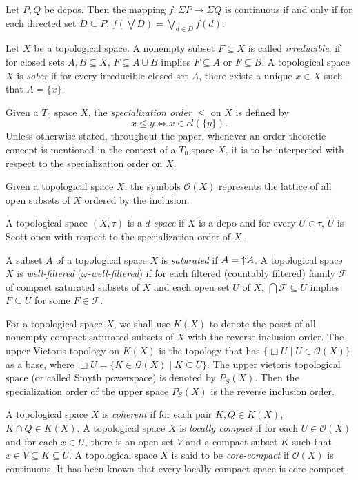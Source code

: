 \documentclass[preprint,12pt]{elsarticle}
\numberwithin{equation}{section}
\newcommand{\up}{\mathord{\uparrow}\hspace{0.05em}}
\begin{document}
\quad Let $P,Q$ be dcpos. Then the mapping $f:\Sigma P\longrightarrow \Sigma Q$ is continuous if and only if for each directed set $D\subseteq P$, $f(\bigvee D)=\bigvee\limits_{d\in D}f(d)$.

\quad Let $X$ be a topological space. A nonempty subset $F\subseteq X$ is called {\em irreducible}, if for closed sets $A, B\subseteq X$, $F\subseteq A\cup B$ implies $F\subseteq A$ or $F\subseteq B$. A topological space $X$ is {\em sober} if for every irreducible closed set $A$, there exists a unique $x\in X$ such that $A=\overline{\{x\}}$.

\quad Given a $T_{0}$ space $X$, the {\em specialization order} $\leq$ on $X$ is defined by
$$x\leq y \Longleftrightarrow x\in cl(\{y\}).$$
Unless otherwise stated, throughout
the paper, whenever an order-theoretic concept is mentioned in the context of a $T_{0}$ space $X$, it is to be interpreted with respect to the specialization order on $X$.

\quad Given a topological space $X$, the symbols $\mathcal{O}(X)$ represents the lattice of all open subsets of $X$ ordered by the inclusion.

\quad A topological space $(X,\tau)$ is a {\em $d$-space} if $X$ is a dcpo and for every $U\in\tau$, $U$ is Scott open with respect to the specialization order of $X$.

\quad A subset $A$ of a topological space $X$ is {\em saturated} if $A=\up A$. A topological space $X$ is {\em well-filtered} ({\em $\omega$-well-filtered}) if for each filtered (countably filtered) family $\mathcal{F}$ of compact saturated subsets of $X$ and each open set $U$ of $X$, $\bigcap \mathcal{F}\subseteq U$ implies $F\subseteq U$ for some $F\in\mathcal{F}$.

 \quad For a topological space $X$, we shall use $K(X)$ to denote the poset of all nonempty
compact saturated subsets of $X$ with the reverse inclusion order. The upper Vietoris topology on $K(X)$ is the topology that has $\{\Box U\mid U\in\mathcal{O}(X)\}$ as a base, where $\Box U=\{K\in\mathcal{Q}(X)\mid K\subseteq U\}$. The upper vietoris topological space (or called Smyth powerspace) is denoted by $P_{S}(X)$. Then the specialization order of the upper space $P_{S}(X)$ is the reverse inclusion order.

\quad A topological space $X$ is {\em coherent} if for each pair $K,Q\in K(X)$, $K\cap Q\in K(X)$. A topological space $X$ is {\em locally compact} if for each $U\in \mathcal{O}(X)$ and for each $x\in U$, there is an open set $V$ and a compact subset $K$ such that $x\in V\subseteq K\subseteq U$. A topological space $X$ is said to be  {\em core-compact } if  $\mathcal{O}(X)$ is continuous. It has been known that every locally compact space is core-compact.
\end{document}
